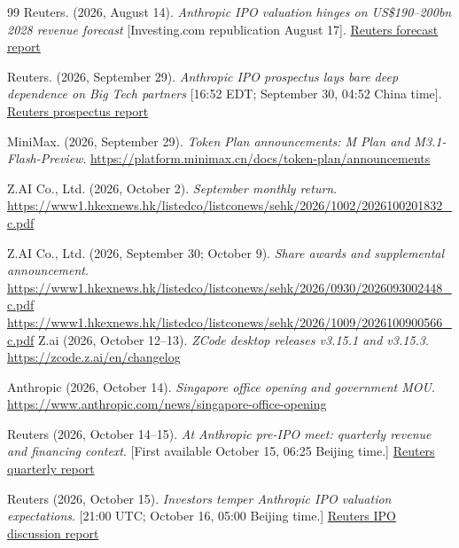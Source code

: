 \documentclass[11pt]{article}
\begin{document}
\begin{thebibliography}{99}
Reuters. (2026, August 14). \emph{Anthropic IPO valuation hinges on US\$190--200bn 2028 revenue forecast}
[Investing.com republication August 17].
\href{https://www.investing.com/news/stock-market-news/anthropic-ipo-valuation-hinges-on-190200-billion-2028-revenue-forecast-sources-say-4862222}{Reuters forecast report}

Reuters. (2026, September 29). \emph{Anthropic IPO prospectus lays bare deep dependence on Big Tech partners}
[16:52 EDT; September 30, 04:52 China time].
\href{https://www.streetinsider.com/Reuters/Exclusive-Anthropic\%2BIPO\%2Bprospectus\%2Blays\%2Bbare\%2Bdeep\%2Bdependence\%2Bon\%2BBig\%2BTech\%2Bpartners/27123187.html}{Reuters prospectus report}

MiniMax. (2026, September 29). \emph{Token Plan announcements: M Plan and M3.1-Flash-Preview}.
\url{https://platform.minimax.cn/docs/token-plan/announcements}

Z.AI Co., Ltd. (2026, October 2). \emph{September monthly return}.
\url{https://www1.hkexnews.hk/listedco/listconews/sehk/2026/1002/2026100201832_c.pdf}

Z.AI Co., Ltd. (2026, September 30; October 9). \emph{Share awards and supplemental announcement}.
\url{https://www1.hkexnews.hk/listedco/listconews/sehk/2026/0930/2026093002448_c.pdf}
\url{https://www1.hkexnews.hk/listedco/listconews/sehk/2026/1009/2026100900566_c.pdf}
Z.ai (2026, October 12--13). \emph{ZCode desktop releases v3.15.1 and v3.15.3}.
\url{https://zcode.z.ai/en/changelog}

Anthropic (2026, October 14). \emph{Singapore office opening and government MOU}.
\url{https://www.anthropic.com/news/singapore-office-opening}


Reuters (2026, October 14--15). \emph{At Anthropic pre-IPO meet: quarterly revenue and financing context}.
[First available October 15, 06:25 Beijing time.]
\href{https://uk.marketscreener.com/news/anthropic-s-q3-revenue-surges-45-to-nearly-17-billion-ce785dd2d08cf221}{Reuters quarterly report}

Reuters (2026, October 15). \emph{Investors temper Anthropic IPO valuation expectations}.
[21:00 UTC; October 16, 05:00 Beijing time.]
\href{https://www.aol.com/articles/exclusive-investors-temper-anthropic-ipo-210007000.html}{Reuters IPO discussion report}


\end{thebibliography}
\end{document}
